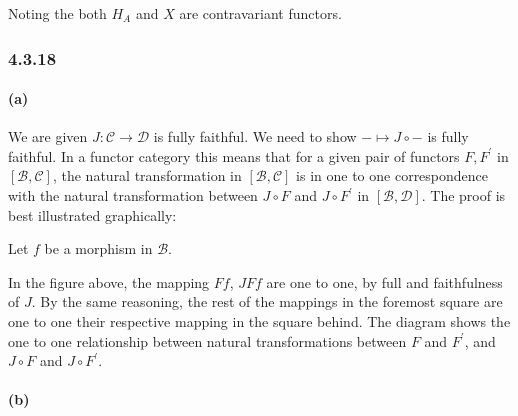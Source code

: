 \documentclass{article}
\begin{document}
Noting the both $H_A$ and $X$ are contravariant functors.

\subsubsection*{4.3.18}

\paragraph{(a)}

We are given $J\colon \mathcal{C} \rightarrow \mathcal{D}$ is fully faithful. We need to show $\mathit{-} \mapsto J \circ \mathit{-}$ is fully faithful. In a functor category this means that for a given pair of functors $F, F^\prime$ in $[\mathcal{B,C}]$,  the natural transformation in $[\mathcal{B,C}]$ is in one to one correspondence with the natural transformation between $J \circ F$ and $J \circ F^\prime$ in $[\mathcal{B},\mathcal{D}]$. The proof is best illustrated graphically:

Let $f$ be a morphism in $\mathcal{B}$.


In the figure above, the mapping $Ff$, $JFf$ are one to one, by full and faithfulness of $J$. By the same reasoning, the rest of the mappings in the foremost square are one to one their respective mapping in the square behind. The diagram shows the one to one relationship between natural transformations between $F$  and $F^\prime$, and $J\circ F$ and $J \circ F^\prime$.
\paragraph{(b)}
\end{document}
